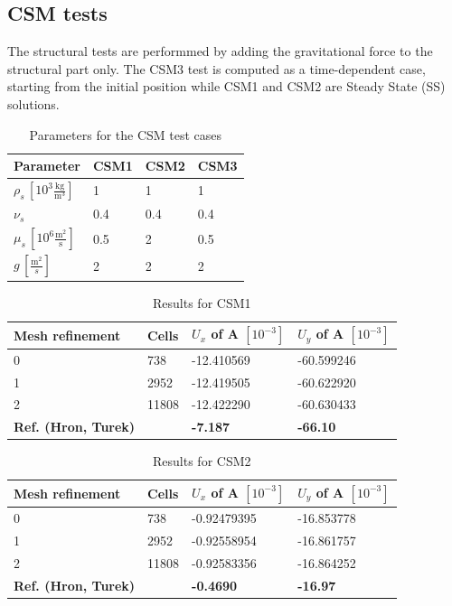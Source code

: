 \subsection{CSM tests}
The structural tests are performmed by adding the gravitational force to the structural part only. The CSM3 test is computed as a time-dependent case, starting from the initial position while CSM1 and CSM2 are Steady State (SS) solutions. 
\begin{table}[!ht]
\begin{center}
  \begin{tabular}{|l | l | l | l|} \hline
	Parameter & CSM1 & CSM2 & CSM3 \\ \hline
    $\rho_s\, [10^3\frac{\text{kg}}{\text{m}^3}]$  & 1 & 1 & 1 \\   \hline
    $\nu_s $ & 0.4 & 0.4 & 0.4 \\ \hline
    $\mu_s \,[10^{6}\frac{\text{m}^2}{\text{s}}]$ & 0.5 & 2 & 0.5   \\ \hline
    $g \, [\frac{\text{m}^2}{s}]$ & 2 & 2 & 2 \\ \hline
    \hline
  \end{tabular}
\end{center}
\caption{Parameters for the CSM test cases}
\end{table}

\begin{table}[!h]
\begin{center}
  \begin{tabular}{|l | l | l | l|} \hline
	Mesh refinement & Cells & $U_x$ of A $[10^{-3}]$ & $U_y$ of A $[10^{-3}]$\\ \hline
    0  & 738 & -12.410569 & -60.599246 \\   \hline
    1 & 2952 & -12.419505 & -60.622920 \\ \hline
    2 & 11808 & -12.422290 & -60.630433   \\ \hline \hline
    \textbf{Ref. (Hron, Turek)}  & & \textbf{-7.187} & \textbf{-66.10} \\ \hline 
    \hline
  \end{tabular}
\end{center}
\caption{Results for CSM1}
\end{table}

\begin{table}[!h]
\begin{center}
  \begin{tabular}{|l | l | l | l|} \hline
	Mesh refinement & Cells & $U_x$ of A $[10^{-3}]$ & $U_y$ of A $[10^{-3}]$\\ \hline
    0  & 738 & -0.92479395 & -16.853778 \\   \hline
    1 & 2952 & -0.92558954 & -16.861757 \\ \hline
    2 & 11808 & -0.92583356 & -16.864252   \\ \hline \hline
    \textbf{Ref. (Hron, Turek)}  & & \textbf{-0.4690} & \textbf{-16.97} \\ \hline 
    \hline
  \end{tabular}
\end{center}
\caption{Results for CSM2}
\end{table}



